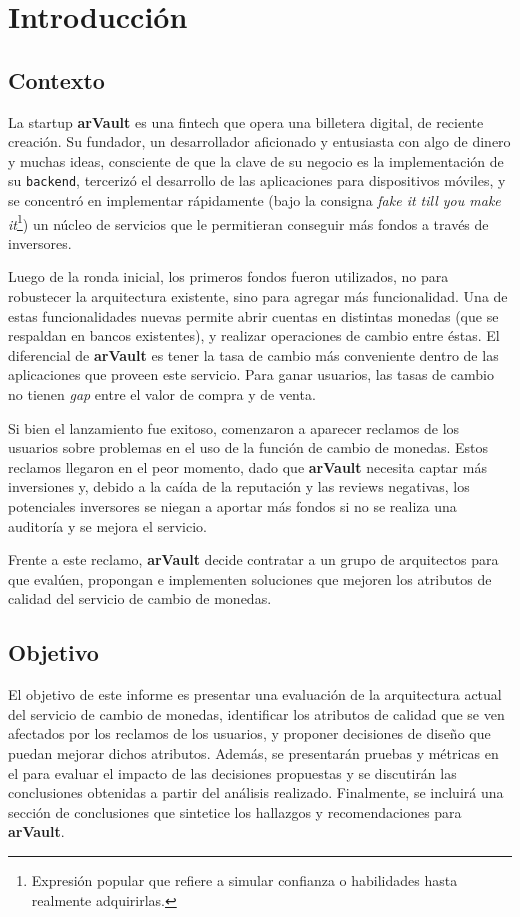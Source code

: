 \section{Introducción}
\label{sec:introduccion}
\subsection{Contexto}
La startup \textbf{arVault} es una fintech que opera una billetera digital, de reciente creación. Su fundador, un desarrollador aficionado y entusiasta con algo de dinero y muchas ideas, consciente de que la clave de su negocio es la implementación de su \texttt{backend}, tercerizó el desarrollo de las aplicaciones para dispositivos móviles, y se concentró en implementar rápidamente (bajo la consigna \textit{fake it till you make it}\footnote{Expresión popular que refiere a simular confianza o habilidades hasta realmente adquirirlas.}) un núcleo de servicios que le permitieran conseguir más fondos a través de inversores.

Luego de la ronda inicial, los primeros fondos fueron utilizados, no para robustecer la arquitectura existente, sino para agregar más funcionalidad. Una de estas funcionalidades nuevas permite abrir cuentas en distintas monedas (que se respaldan en bancos existentes), y realizar operaciones de cambio entre éstas. El diferencial de \textbf{arVault} es tener la tasa de cambio más conveniente dentro de las aplicaciones que proveen este servicio. Para ganar usuarios, las tasas de cambio no tienen \textit{gap} entre el valor de compra y de venta.

Si bien el lanzamiento fue exitoso, comenzaron a aparecer reclamos de los usuarios sobre problemas en el uso de la función de cambio de monedas. Estos reclamos llegaron en el peor momento, dado que \textbf{arVault} necesita captar más inversiones y, debido a la caída de la reputación y las reviews negativas, los potenciales inversores se niegan a aportar más fondos si no se realiza una auditoría y se mejora el servicio.

Frente a este reclamo, \textbf{arVault} decide contratar a un grupo de arquitectos para que evalúen, propongan e implementen soluciones que mejoren los atributos de calidad del servicio de cambio de monedas.

\subsection{Objetivo}

El objetivo de este informe es presentar una evaluación de la arquitectura actual del servicio de cambio de monedas, identificar los atributos de calidad que se ven afectados por los reclamos de los usuarios, y proponer decisiones de diseño  que puedan mejorar dichos atributos. Además, se presentarán pruebas y métricas en el para evaluar el impacto de las decisiones propuestas y se discutirán las conclusiones obtenidas a partir del análisis realizado. Finalmente, se incluirá una sección de conclusiones que sintetice los hallazgos y recomendaciones para \textbf{arVault}.

